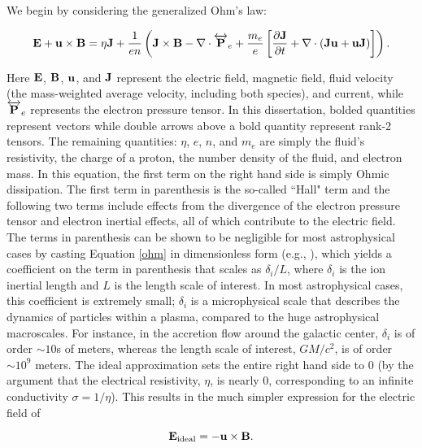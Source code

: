 We begin by considering the generalized Ohm's law:

\begin{equation}
	\bold{E}+\bold{u}\times \bold{B} = 
	\eta \bold{J} + \frac{1}{e n}\left(\bold{J} \times \bold{B} - \nabla \cdot \overleftrightarrow{\bold{P}}_{e} + \frac{m_e}{e}\left[\frac{\partial \bold{J}}{\partial t}+\nabla \cdot (\bold{Ju} + \bold{uJ})\right]\right).
	\label{ohm}
\end{equation}

Here $\bold{E}$, $\bold{B}$, $\bold{u}$, and $\bold{J}$ represent the electric field, magnetic field, fluid velocity (the mass-weighted average velocity, including both species), and current, while $\overleftrightarrow{\bold{P}}_e$ represents the electron pressure tensor.  In this dissertation, bolded quantities represent vectors while double arrows above a bold quantity represent rank-2 tensors.  The remaining quantities: $\eta$, $e$, $n$, and $m_e$ are simply the fluid's resistivity, the charge of a proton, the number density of the fluid, and electron mass.  In this equation, the first term on the right hand side is simply Ohmic dissipation. The first term in parenthesis is the so-called ``Hall" term and the following two terms include effects from the divergence of the electron pressure tensor and electron inertial effects, all of which contribute to the electric field.  The terms in parenthesis can be shown to be negligible for most astrophysical cases by casting Equation \ref{ohm} in dimensionless form (e.g., \citealt{gourdain2017}), which yields a coefficient on the term in parenthesis that scales as $\delta_i/L$, where $\delta_i$ is the ion inertial length and $L$ is the length scale of interest.  In most astrophysical cases, this coefficient is extremely small; $\delta_i$ is a microphysical scale that describes the dynamics of particles within a plasma, compared to the huge astrophysical macroscales.  For instance, in the accretion flow around the galactic center, $\delta_i$ is of order $\sim 10$s  of meters, whereas the length scale of interest, $GM/c^2$, is of order $\sim 10^9$ meters.  The ideal approximation sets the entire right hand side to 0 (by the argument that the electrical resistivity, $\eta$, is nearly 0, corresponding to an infinite conductivity $\sigma=1/\eta$).  This results in the much simpler expression for the electric field of

\begin{equation}
	\bold{E}_{\rm{ideal}}=-\bold{u}\times \bold{B}.
	\label{ideal_E}
\end{equation} 


